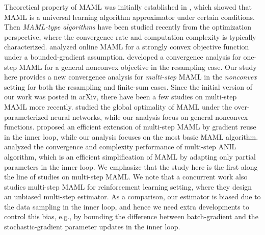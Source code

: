 \documentclass{osudissert96}
\begin{document}
% 
Theoretical property of MAML was initially established in \cite{finn2018meta}, which showed that MAML is a universal learning algorithm approximator under certain conditions. Then {\em MAML-type algorithms} have been studied recently from the optimization perspective, where the convergence rate and computation complexity is typically characterized. \cite{finn2019online} analyzed online MAML for a strongly convex objective function under a bounded-gradient assumption. 
 \cite{fallah2020convergence} developed a convergence analysis for one-step MAML for a general nonconvex objective in the  resampling case. Our study here provides a new convergence analysis for {\em multi-step} MAML in the {\em nonconvex} setting for both the resampling  and  finite-sum cases.  Since the initial version of our work was posted in arXiv, there have been a few studies on multi-step MAML more recently. \cite{wang2020global2,wang2020global} studied the global optimality of MAML under the over-parameterized neural networks, while our analysis focus on general nonconvex functions.  
\cite{kim2020multi} 
proposed an efficient extension of multi-step MAML by gradient reuse in the inner loop, while our analysis focuses on the most basic MAML algorithm.  
\cite{ji2020convergence} analyzed the convergence and complexity performance of multi-step ANIL algorithm, which is an efficient simplification of MAML by adapting only partial parameters in the inner loop. 
We emphasize that the study here is the first along the line of studies on multi-step MAML. We note that a concurrent work \cite{fallah2020provably} also studies multi-step MAML for reinforcement learning setting, where they design an unbiased multi-step estimator. As a comparison, our estimator is biased due to the data sampling in the inner loop, and hence we need extra developments to control this bias, e.g.,  by bounding the difference between batch-gradient and the stochastic-gradient parameter updates in the inner loop.  

% 
%
\end{document}
